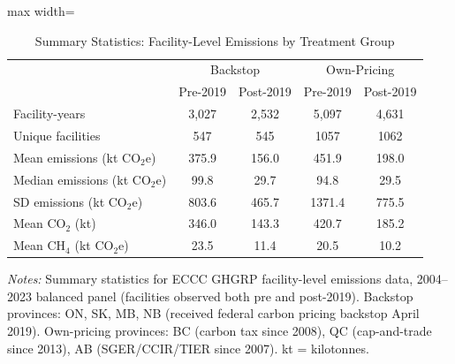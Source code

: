 \begin{table}[htbp]
\centering
\caption{Summary Statistics: Facility-Level Emissions by Treatment Group}
\label{tab:sumstats}
\small
\begin{adjustbox}{max width=\textwidth}
\begin{tabular}{lcccc}
\hline\hline
 & \multicolumn{2}{c}{Backstop} & \multicolumn{2}{c}{Own-Pricing} \\
 & Pre-2019 & Post-2019 & Pre-2019 & Post-2019 \\
\hline
Facility-years & 3,027 & 2,532 & 5,097 & 4,631 \\
Unique facilities & 547 & 545 & 1057 & 1062 \\
Mean emissions (kt CO$_2$e) & 375.9 & 156.0 & 451.9 & 198.0 \\
Median emissions (kt CO$_2$e) & 99.8 & 29.7 & 94.8 & 29.5 \\
SD emissions (kt CO$_2$e) & 803.6 & 465.7 & 1371.4 & 775.5 \\
Mean CO$_2$ (kt) & 346.0 & 143.3 & 420.7 & 185.2 \\
Mean CH$_4$ (kt CO$_2$e) & 23.5 & 11.4 & 20.5 & 10.2 \\
\hline\hline
\end{tabular}
\end{adjustbox}
\par\vspace{0.3em}
{\footnotesize \textit{Notes:} Summary statistics for ECCC GHGRP facility-level emissions data, 2004--2023 balanced panel (facilities observed both pre and post-2019). Backstop provinces: ON, SK, MB, NB (received federal carbon pricing backstop April 2019). Own-pricing provinces: BC (carbon tax since 2008), QC (cap-and-trade since 2013), AB (SGER/CCIR/TIER since 2007). kt = kilotonnes.}
\end{table}

